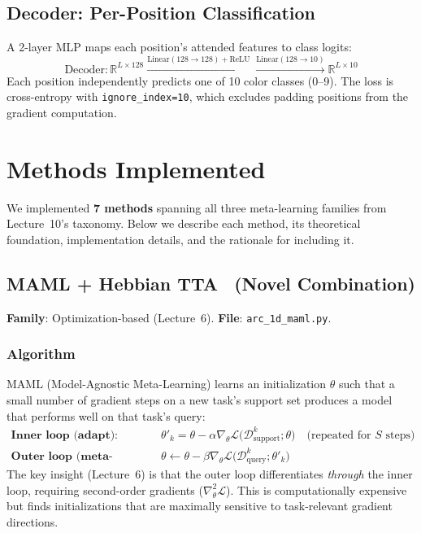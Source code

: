 \documentclass[11pt,a4paper]{article}
\begin{document}
\subsection{Decoder: Per-Position Classification}
A 2-layer MLP maps each position's attended features to class logits:
\begin{equation}
  \text{Decoder}: \mathbb{R}^{L \times 128} \xrightarrow{\text{Linear}(128 \to 128)+\text{ReLU}} \xrightarrow{\text{Linear}(128 \to 10)} \mathbb{R}^{L \times 10}
\end{equation}
Each position independently predicts one of 10 color classes (0--9). The loss is cross-entropy with \texttt{ignore\_index=10}, which excludes padding positions from the gradient computation.

\section{Methods Implemented}

We implemented \textbf{7 methods} spanning all three meta-learning families from Lecture~10's taxonomy. Below we describe each method, its theoretical foundation, implementation details, and the rationale for including it.

\subsection{MAML + Hebbian TTA~\cite{finn2017} \textnormal{\textcolor{novelorange}{(Novel Combination)}}}
\textbf{Family}: Optimization-based (Lecture~6). \textbf{File}: \texttt{arc\_1d\_maml.py}.

\subsubsection{Algorithm}
MAML (Model-Agnostic Meta-Learning) learns an initialization $\theta$ such that a small number of gradient steps on a new task's support set produces a model that performs well on that task's query:
\begin{align}
  \textbf{Inner loop (adapt):} \quad & \theta'_k = \theta - \alpha \nabla_\theta \mathcal{L}\bigl(\mathcal{D}_{\text{support}}^k; \theta\bigr) \quad \text{(repeated for $S$ steps)} \\
  \textbf{Outer loop (meta-update):} \quad & \theta \leftarrow \theta - \beta \nabla_\theta \mathcal{L}\bigl(\mathcal{D}_{\text{query}}^k; \theta'_k\bigr)
\end{align}
The key insight (Lecture~6) is that the outer loop differentiates \emph{through} the inner loop, requiring second-order gradients ($\nabla^2_\theta \mathcal{L}$). This is computationally expensive but finds initializations that are maximally sensitive to task-relevant gradient directions.
\end{document}

